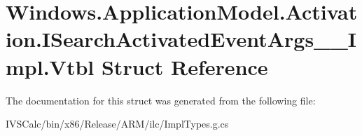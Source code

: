 \hypertarget{struct_windows_1_1_application_model_1_1_activation_1_1_i_search_activated_event_args_____impl_1_1_vtbl}{}\section{Windows.\+Application\+Model.\+Activation.\+I\+Search\+Activated\+Event\+Args\+\_\+\+\_\+\+Impl.\+Vtbl Struct Reference}
\label{struct_windows_1_1_application_model_1_1_activation_1_1_i_search_activated_event_args_____impl_1_1_vtbl}


The documentation for this struct was generated from the following file\+:\begin{DoxyCompactItemize}
\item 
I\+V\+S\+Calc/bin/x86/\+Release/\+A\+R\+M/ilc/Impl\+Types.\+g.\+cs\end{DoxyCompactItemize}
